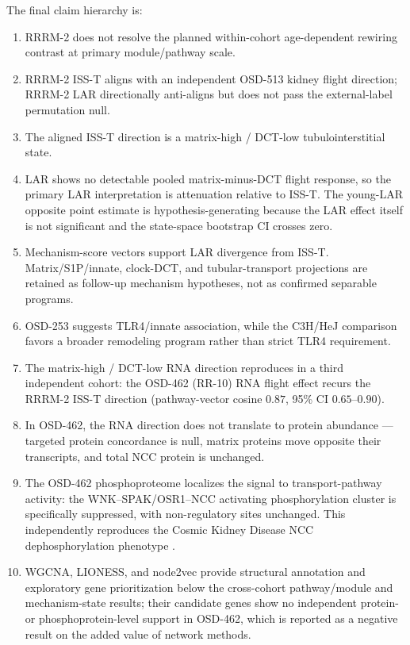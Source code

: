 \documentclass[11pt]{article}
\begin{document}
The final claim hierarchy is:
\begin{enumerate}
  \item RRRM-2 does not resolve the planned within-cohort age-dependent rewiring contrast at primary module/pathway scale.
  \item RRRM-2 ISS-T aligns with an independent OSD-513 kidney flight direction; RRRM-2 LAR directionally anti-aligns but does not pass the external-label permutation null.
  \item The aligned ISS-T direction is a matrix-high / DCT-low tubulointerstitial state.
  \item LAR shows no detectable pooled matrix-minus-DCT flight response, so the primary LAR interpretation is attenuation relative to ISS-T. The young-LAR opposite point estimate is hypothesis-generating because the LAR effect itself is not significant and the state-space bootstrap CI crosses zero.
  \item Mechanism-score vectors support LAR divergence from ISS-T. Matrix/S1P/innate, clock-DCT, and tubular-transport projections are retained as follow-up mechanism hypotheses, not as confirmed separable programs.
  \item OSD-253 suggests TLR4/innate association, while the C3H/HeJ comparison favors a broader remodeling program rather than strict TLR4 requirement.
  \item The matrix-high / DCT-low RNA direction reproduces in a third independent cohort: the OSD-462 (RR-10) RNA flight effect recurs the RRRM-2 ISS-T direction (pathway-vector cosine $0.87$, 95\% CI $0.65$--$0.90$).
  \item In OSD-462, the RNA direction does not translate to protein abundance --- targeted protein concordance is null, matrix proteins move opposite their transcripts, and total NCC protein is unchanged.
  \item The OSD-462 phosphoproteome localizes the signal to transport-pathway activity: the WNK--SPAK/OSR1--NCC activating phosphorylation cluster is specifically suppressed, with non-regulatory sites unchanged. This independently reproduces the Cosmic Kidney Disease NCC dephosphorylation phenotype \citep{siew2024cosmic}.
  \item WGCNA, LIONESS, and node2vec provide structural annotation and exploratory gene prioritization below the cross-cohort pathway/module and mechanism-state results; their candidate genes show no independent protein- or phosphoprotein-level support in OSD-462, which is reported as a negative result on the added value of network methods.
\end{enumerate}
\end{document}
